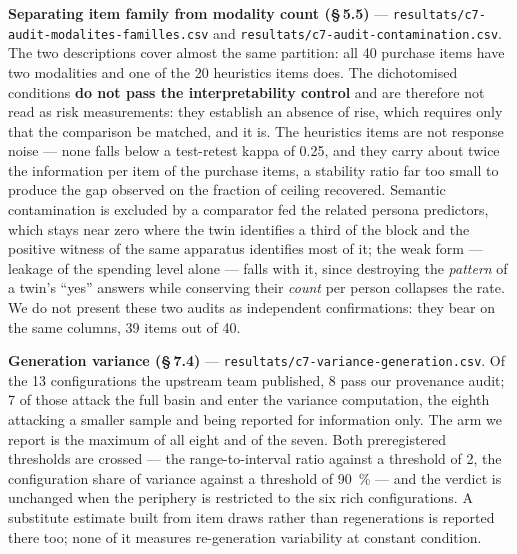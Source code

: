 \documentclass[sigconf,anonymous,review]{acmart}
\begin{document}
\textbf{Separating item family from modality count (\S\,5.5)} --- \texttt{resultats/\allowbreak{}c7-\allowbreak{}audit-\allowbreak{}modalites-\allowbreak{}familles\allowbreak{}.csv} and \texttt{resultats/\allowbreak{}c7-\allowbreak{}audit-\allowbreak{}contamination\allowbreak{}.csv}. The two descriptions cover almost the same partition: all 40 purchase items have two modalities and one of the 20 heuristics items does. The dichotomised conditions \textbf{do not pass the interpretability control} and are therefore not read as risk measurements: they establish an absence of rise, which requires only that the comparison be matched, and it is. The heuristics items are not response noise --- none falls below a test-retest kappa of 0.25, and they carry about twice the information per item of the purchase items, a stability ratio far too small to produce the gap observed on the fraction of ceiling recovered. Semantic contamination is excluded by a comparator fed the related persona predictors, which stays near zero where the twin identifies a third of the block and the positive witness of the same apparatus identifies most of it; the weak form --- leakage of the spending level alone --- falls with it, since destroying the \textit{pattern} of a twin's ``yes'' answers while conserving their \textit{count} per person collapses the rate. We do not present these two audits as independent confirmations: they bear on the same columns, 39 items out of 40.

\textbf{Generation variance (\S\,7.4)} --- \texttt{resultats/\allowbreak{}c7-\allowbreak{}variance-\allowbreak{}generation\allowbreak{}.csv}. Of the 13 configurations the upstream team published, 8 pass our provenance audit; 7 of those attack the full basin and enter the variance computation, the eighth attacking a smaller sample and being reported for information only. The arm we report is the maximum of all eight and of the seven. Both preregistered thresholds are crossed --- the range-to-interval ratio against a threshold of 2, the configuration share of variance against a threshold of 90~\% --- and the verdict is unchanged when the periphery is restricted to the six rich configurations. A substitute estimate built from item draws rather than regenerations is reported there too; none of it measures re-generation variability at constant condition.
\end{document}
